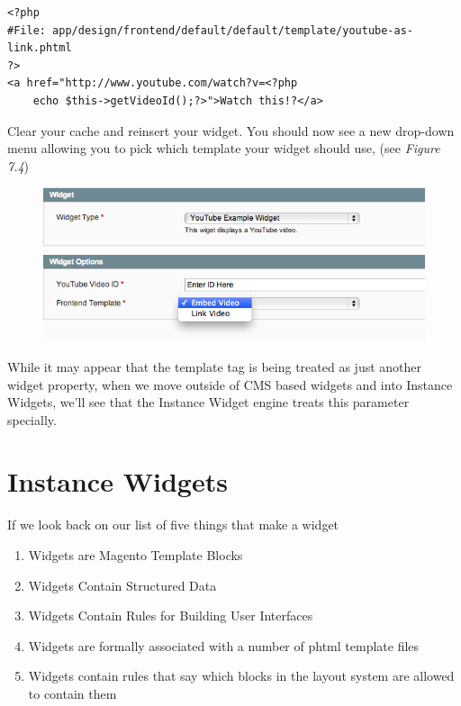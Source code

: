 \documentclass[oneside]{book}
\begin{document}
\begin{lstlisting}
<?php
#File: app/design/frontend/default/default/template/youtube-as-link.phtml
?>
<a href="http://www.youtube.com/watch?v=<?php
    echo $this->getVideoId();?>">Watch this!?</a>

\end{lstlisting}


Clear your cache and reinsert your widget.  You should now see a new drop-down menu allowing you to pick which template your widget should use, (see \emph{Figure 7.4})

\begin{figure}[htb]
\begin{center}
\leavevmode
\includegraphics[width=1\textwidth]{images/chapter7/with-template.png}
\end{center}
\caption{}
\end{figure}


While it may appear that the template tag is being treated as just another widget property, when we move outside of CMS based widgets and into Instance Widgets, we'll see that the Instance Widget engine treats this parameter specially.

\section{Instance Widgets}

If we look back on our list of five things that make a widget

\begin{enumerate}
\item Widgets are Magento Template Blocks
\item Widgets Contain Structured Data
\item Widgets Contain Rules for Building User Interfaces
\item Widgets are formally associated with a number of phtml template files
\item Widgets contain rules that say which blocks in the layout system are allowed to contain them
\end{enumerate}
\end{document}
